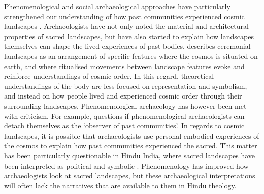 	Phenomenological and social archaeological approaches have particularly strengthened our understanding of how past communities experienced cosmic landscapes \parencites{MeskellPreucel_2007}{Tilley_1994}. Archaeologists have not only noted the material and architectural properties of sacred landscapes, but have also started to explain how landscapes themselves can shape the lived experiences of past bodies.\textcite[199]{Ashmore_2010} describes ceremonial landscapes as an arrangement of specific features where the cosmos is situated on earth, and where ritualised movements between landscape features evoke and reinforce understandings of cosmic order. In this regard, theoretical understandings of the body are less focused on representation and symbolism, and instead on how people lived and experienced cosmic order through their surrounding landscapes. Phenomenological archaeology has however been met with criticism. For example,\textcite [271]{Fleming_2006} questions if phenomenological archaeologists can detach themselves as the ‘observer of past communities’. In regards to cosmic landscapes, it is possible that archaeologists use personal embodied experiences of the cosmos to explain how past communities experienced the sacred. This matter has been particularly questionable in Hindu India, where sacred landscapes have been interpreted as political and symbolic \parencites{Fritz_1986}{Mack_2004}{Sinopoli_2010}. Phenomenology has improved how archaeologists look at sacred landscapes, but these archaeological interpretations will often lack the narratives that are available to them in Hindu theology.

